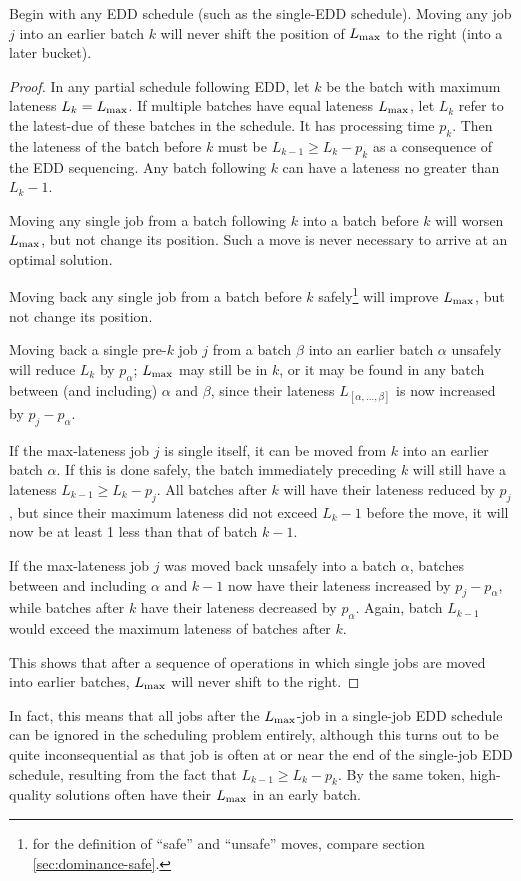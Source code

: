 \documentclass[13pt, letterpaper, oneside]{book}
\begin{document}
\begin{proposition}
Begin with any EDD schedule (such as the single-EDD schedule). Moving any job
$j$ into an earlier batch $k$ will never shift the position of $L_{\text{max}}$ to the
right (into a later bucket).

\begin{proof}
In any partial schedule following EDD, let $k$ be the batch
with maximum lateness $L_k = L_{\text{max}}$. If multiple batches have equal lateness
$L_{\text{max}}$, let $L_k$ refer to the latest-due of these batches in the schedule. It has processing time $p_k$. Then the lateness of the
batch before $k$ must be $L_{k-1} \geq L_k - p_k$ as a consequence of the EDD
sequencing. Any batch following $k$ can have a lateness no greater than $L_k -
1$.

\begin{alist}
\item{Moving any single job from a batch following $k$ into a batch before $k$ will
worsen $L_{\text{max}}$, but not change its position. Such a move is never necessary to
arrive at an optimal solution.}
\item{Moving back any single job from a
batch before $k$ safely\footnote{for the definition of ``safe'' and
``unsafe'' moves, compare section \ref{sec:dominance-safe}.} will improve $L_{\text{max}}$,
but not change its position.}
\item{Moving back a single pre-$k$ job $j$ from a batch
$\beta$ into an earlier batch $\alpha$ unsafely will reduce $L_k$ by
$p_\alpha$; $L_{\text{max}}$ may still be in $k$, or it may be found in any batch between
(and including) $\alpha$ and $\beta$, since their lateness
$L_{[\alpha,\dots,\beta]}$ is now increased by $p_j - p_\alpha$.}
\item{If the
max-lateness job $j$ is single itself, it can be moved from $k$ into an earlier
batch $\alpha$. If this is done safely, the batch immediately preceding
$k$ will still have a lateness $L_{k-1} \geq L_k - p_j$. All batches after $k$
will have their lateness reduced by $p_j$, but since their maximum lateness did
not exceed $L_k - 1$ before the move, it will now be at least 1 less than that
of batch $k-1$.}
\item{If the max-lateness job
$j$ was moved back unsafely into a batch $\alpha$, batches between and
including $\alpha$ and $k-1$ now have their lateness increased by $p_j - p_\alpha$,
while batches after $k$ have their lateness decreased by $p_\alpha$. Again,
batch $L_{k-1}$ would exceed the maximum lateness of batches after $k$.}
\end{alist}
This shows that after a sequence of operations in which single jobs are moved into
earlier batches, $L_{\text{max}}$ will never shift to the right. 
\end{proof}
\end{proposition}
In fact, this means that all jobs after the $L_{\text{max}}$-job in a single-job EDD
schedule can be ignored in the scheduling problem entirely, although this turns
out to be quite inconsequential as that job is often at or near the end of the
single-job EDD schedule, resulting from the fact that $L_{k-1} \geq L_k - p_k$.
By the same token, high-quality solutions often have their $L_{\text{max}}$ in an early
batch.
\end{document}
